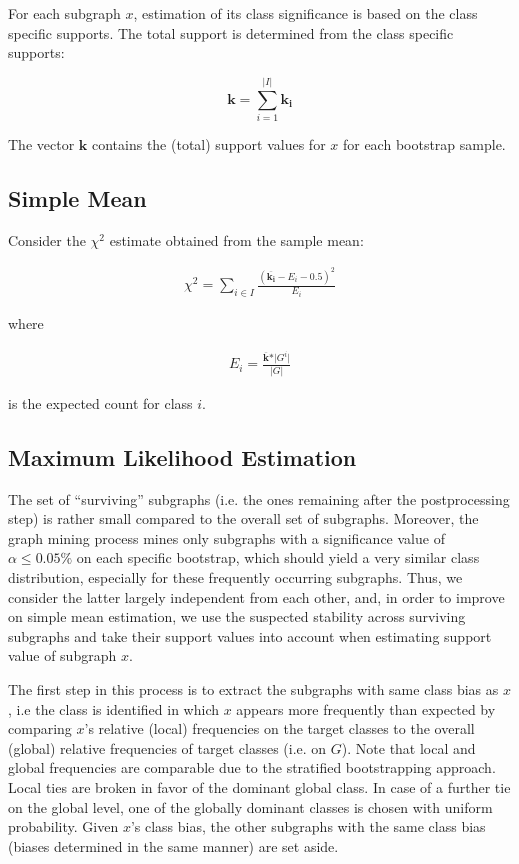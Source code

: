 \documentclass{article}
\begin{document}
For each subgraph $x$, estimation of its class significance is based on the class specific supports. 
The total support is determined from the class specific supports:

\begin{equation}
  \mathbf{k}=\sum_{i=1}^{\vert I\vert} \mathbf{k_i}
  \label{eqn:total-support}
\end{equation}

The vector $\mathbf{k}$ contains the (total) support values for $x$ for each bootstrap sample.

\subsection{Simple Mean}
\label{ss:simple-mean}

Consider the $\chi^2$ estimate obtained from the sample mean:

\begin{align}
  \chi^2 = \sum_{i \in I} \frac{(\overline{\mathbf{k_i}}-E_i-0.5)^2}{E_i} 
  \label{align:meanX2}
\end{align}

where 

\begin{align}
  E_i=\frac{\overline{\mathbf{k}}*\vert G^i\vert}{\vert G \vert}
\end{align}

is the expected count for class $i$.

\subsection{Maximum Likelihood Estimation}
\label{ss:MLE}

The set of ``surviving'' subgraphs (i.e. the ones remaining after the
postprocessing step) is rather small compared to the overall set of subgraphs.
Moreover, the graph mining process mines only subgraphs with a significance
value of $\alpha \le 0.05\%$ on each specific bootstrap, which should yield a very similar
class distribution, especially for these frequently occurring subgraphs.  Thus,
we consider the latter largely independent from each other, and, in order to
improve on simple mean estimation, we use the suspected stability across
surviving subgraphs and take their support values into account when estimating
support value of subgraph $x$. 

The first step in this process is to extract the subgraphs with same class bias
as $x$, i.e the class is identified in which $x$ appears more frequently than
expected by comparing $x$'s relative (local) frequencies on the target classes
to the overall (global) relative frequencies of target classes (i.e. on $G$).
Note that local and global frequencies are comparable due to the stratified
bootstrapping approach. Local ties are broken in favor of the dominant global
class. In case of a further tie on the global level, one of the globally
dominant classes is chosen with uniform probability. Given $x$'s class bias,
the other subgraphs with the same class bias (biases determined in the same
manner) are set aside.
\end{document}
